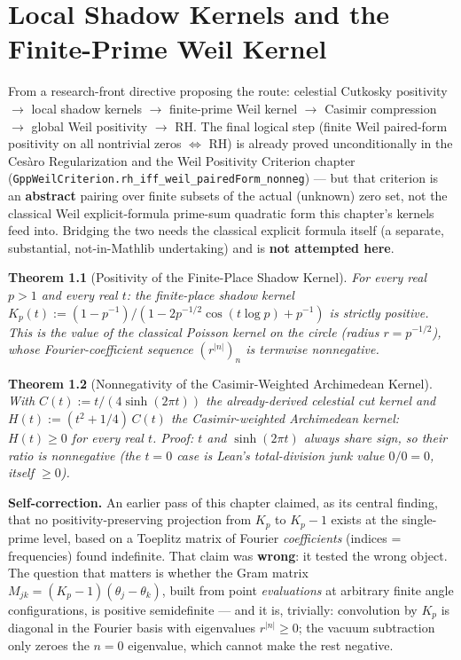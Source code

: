 \documentclass{report}
\newtheorem{theorem}{Theorem}[chapter]
\theoremstyle{definition}
\begin{document}
\chapter{Local Shadow Kernels and the Finite-Prime Weil Kernel}

From a research-front directive proposing the route: celestial Cutkosky positivity
$\to$ local shadow kernels $\to$ finite-prime Weil kernel $\to$ Casimir compression
$\to$ global Weil positivity $\to$ RH. The final logical step (finite Weil paired-form
positivity on all nontrivial zeros $\iff$ RH) is already proved unconditionally in the
Cesàro Regularization and the Weil Positivity Criterion chapter
(\texttt{GppWeilCriterion.rh\_iff\_weil\_pairedForm\_nonneg}) --- but that criterion is
an \textbf{abstract} pairing over finite subsets of the actual (unknown) zero set, not
the classical Weil explicit-formula prime-sum quadratic form this chapter's kernels feed
into. Bridging the two needs the classical explicit formula itself (a separate,
substantial, not-in-Mathlib undertaking) and is \textbf{not attempted here}.

\begin{theorem}[Positivity of the Finite-Place Shadow Kernel]
  \label{thm:kp-pos}
  \leanok
  For every real $p>1$ and every real $t$: the finite-place shadow kernel
  $K_p(t):=(1-p^{-1})/(1-2p^{-1/2}\cos(t\log p)+p^{-1})$ is strictly positive. This is
  the value of the classical Poisson kernel on the circle (radius $r=p^{-1/2}$), whose
  Fourier-coefficient sequence $(r^{|n|})_n$ is termwise nonnegative.
\end{theorem}

\begin{theorem}[Nonnegativity of the Casimir-Weighted Archimedean Kernel]
  \label{thm:h-nonneg}
  \leanok
  With $C(t):=t/(4\sinh(2\pi t))$ the already-derived celestial cut kernel and
  $H(t):=(t^2+1/4)\,C(t)$ the Casimir-weighted Archimedean kernel: $H(t)\geq0$ for every
  real $t$. Proof: $t$ and $\sinh(2\pi t)$ always share sign, so their ratio is
  nonnegative (the $t=0$ case is Lean's total-division junk value $0/0=0$, itself
  $\geq0$).
\end{theorem}

\textbf{Self-correction.} An earlier pass of this chapter claimed, as its central
finding, that no positivity-preserving projection from $K_p$ to $K_p-1$ exists at the
single-prime level, based on a Toeplitz matrix of Fourier \emph{coefficients} (indices
= frequencies) found indefinite. That claim was \textbf{wrong}: it tested the wrong
object. The question that matters is whether the Gram matrix
$M_{jk}=(K_p-1)(\theta_j-\theta_k)$, built from point \emph{evaluations} at arbitrary
finite angle configurations, is positive semidefinite --- and it is, trivially:
convolution by $K_p$ is diagonal in the Fourier basis with eigenvalues $r^{|n|}\geq0$;
the vacuum subtraction only zeroes the $n=0$ eigenvalue, which cannot make the rest
negative.
\end{document}
